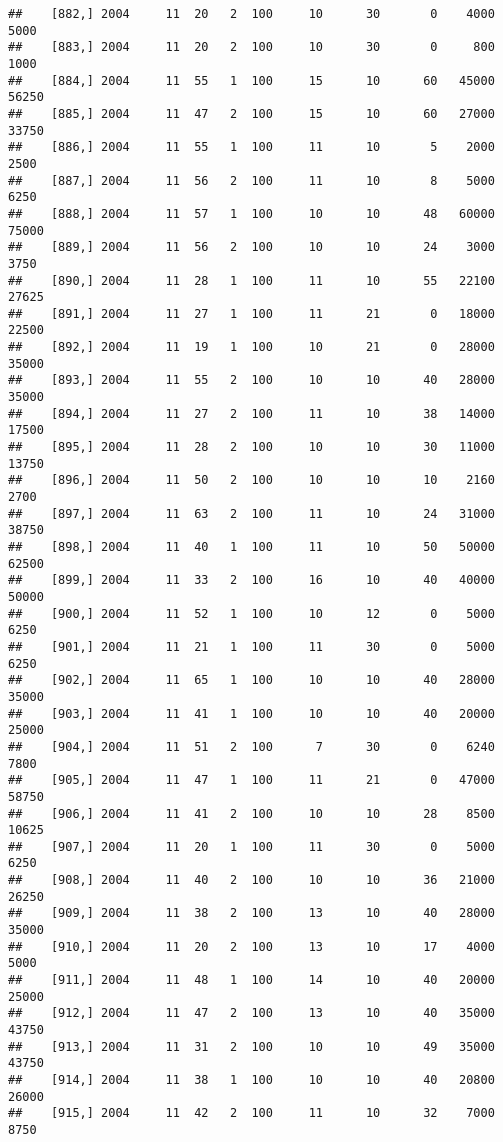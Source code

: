 \documentclass{article}\usepackage[]{graphicx}\usepackage[]{color}
\makeatletter
\newenvironment{kframe}{%
 \def\at@end@of@kframe{}%
 \ifinner\ifhmode%
  \def\at@end@of@kframe{\end{minipage}}%
  \begin{minipage}{\columnwidth}%
 \fi\fi%
 \def\FrameCommand##1{\hskip\@totalleftmargin \hskip-\fboxsep
 \colorbox{shadecolor}{##1}\hskip-\fboxsep
     \hskip-\linewidth \hskip-\@totalleftmargin \hskip\columnwidth}%
 \MakeFramed {\advance\hsize-\width
   \@totalleftmargin\z@ \linewidth\hsize
   \@setminipage}}%
 {\par\unskip\endMakeFramed%
 \at@end@of@kframe}
\newenvironment{knitrout}{}{} %
\makeatother
\begin{document}
\begin{knitrout}
\begin{kframe}
\begin{verbatim}
##    [882,] 2004     11  20   2  100     10      30       0    4000    5000
##    [883,] 2004     11  20   2  100     10      30       0     800    1000
##    [884,] 2004     11  55   1  100     15      10      60   45000   56250
##    [885,] 2004     11  47   2  100     15      10      60   27000   33750
##    [886,] 2004     11  55   1  100     11      10       5    2000    2500
##    [887,] 2004     11  56   2  100     11      10       8    5000    6250
##    [888,] 2004     11  57   1  100     10      10      48   60000   75000
##    [889,] 2004     11  56   2  100     10      10      24    3000    3750
##    [890,] 2004     11  28   1  100     11      10      55   22100   27625
##    [891,] 2004     11  27   1  100     11      21       0   18000   22500
##    [892,] 2004     11  19   1  100     10      21       0   28000   35000
##    [893,] 2004     11  55   2  100     10      10      40   28000   35000
##    [894,] 2004     11  27   2  100     11      10      38   14000   17500
##    [895,] 2004     11  28   2  100     10      10      30   11000   13750
##    [896,] 2004     11  50   2  100     10      10      10    2160    2700
##    [897,] 2004     11  63   2  100     11      10      24   31000   38750
##    [898,] 2004     11  40   1  100     11      10      50   50000   62500
##    [899,] 2004     11  33   2  100     16      10      40   40000   50000
##    [900,] 2004     11  52   1  100     10      12       0    5000    6250
##    [901,] 2004     11  21   1  100     11      30       0    5000    6250
##    [902,] 2004     11  65   1  100     10      10      40   28000   35000
##    [903,] 2004     11  41   1  100     10      10      40   20000   25000
##    [904,] 2004     11  51   2  100      7      30       0    6240    7800
##    [905,] 2004     11  47   1  100     11      21       0   47000   58750
##    [906,] 2004     11  41   2  100     10      10      28    8500   10625
##    [907,] 2004     11  20   1  100     11      30       0    5000    6250
##    [908,] 2004     11  40   2  100     10      10      36   21000   26250
##    [909,] 2004     11  38   2  100     13      10      40   28000   35000
##    [910,] 2004     11  20   2  100     13      10      17    4000    5000
##    [911,] 2004     11  48   1  100     14      10      40   20000   25000
##    [912,] 2004     11  47   2  100     13      10      40   35000   43750
##    [913,] 2004     11  31   2  100     10      10      49   35000   43750
##    [914,] 2004     11  38   1  100     10      10      40   20800   26000
##    [915,] 2004     11  42   2  100     11      10      32    7000    8750

\end{verbatim}
\end{kframe}
\end{knitrout}
\end{document}
